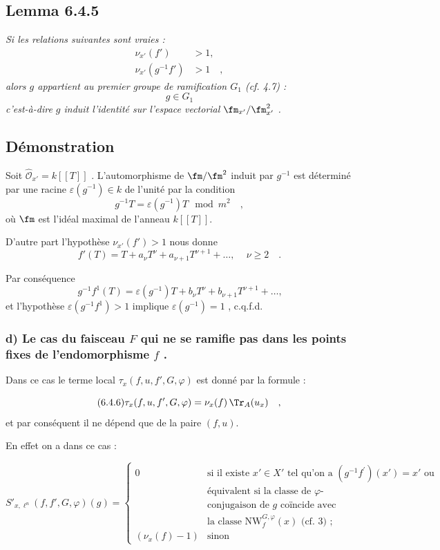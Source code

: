 \subsection*{Lemma 6.4.5}
\emph{Si les relations suivantes sont vraies :}
\begin{align*}
\nu_{x'}(f') &> 1 \text{,} \\
\nu_{x'}(g^{-1}f') &> 1 \quad ,
\end{align*}
\emph{alors $g$ appartient au premier groupe de ramification $G_1$ (cf. 4.7) :}
\[
g \in G_1
\]
\emph{c'est-à-dire $g$ induit l'identité sur l'espace vectorial $\fm_{x'}/\fm_{x'}^2$ .}

\subsection*{Démonstration}
Soit $\widehat{\mathcal{O}}_{x'} = k[[T]]$ . L'automorphisme de $\fm/\fm^2$ induit par $g^{-1}$ est déterminé par une racine $\varepsilon(g^{-1}) \in k$ de l'unité par la condition
\[
g^{-1}T = \varepsilon(g^{-1})T \mod m^2 \quad ,
\]
où $\fm$ est l'idéal maximal de l'anneau $k[[T]]$.

D'autre part l'hypothèse $\nu_{x'}(f') > 1$ nous donne
\[
f'(T) = T + a_\nu T^\nu + a_{\nu+1} T^{\nu+1} + \ldots \text{, } \quad \nu \geq 2 \quad .
\]

Par conséquence
\[
g^{-1}f^{1}(T) = \varepsilon(g^{-1})T + b_\nu T^\nu + b_{\nu+1} T^{\nu+1} + \ldots \text{,}
\]
et l'hypothèse $\varepsilon(g^{-1}f^{1}) > 1$ implique $\varepsilon(g^{-1}) = 1$ , c.q.f.d.

\subsubsection*{d) Le cas du faisceau $F$ qui ne se ramifie pas dans les points fixes de l'endomorphisme $f$ .}

Dans ce cas le terme local $\tau_x(f,u, f', G, \varphi)$ est donné par la formule :

\begin{equation}\tag{6.4.6}
\tau_x(f,u, f', G, \varphi) = \nu_x(f) \, \Tr_A(u_x) \quad ,
\end{equation}
et par conséquent il ne dépend que de la paire $(f,u)$.

En effet on a dans ce cas :

\begin{equation}\tag{6.4.7}
S'_{x,\ell^n}(f, f', G, \varphi)(g) = \begin{cases}
0 & \text{si il existe } x' \in X' \text{ tel qu'on a } (g^{-1}f^{\prime})(x') = x' \text{ ou}\\
& \text{équivalent si la classe de $\varphi$-}\\
& \text{conjugaison de $g$ coïncide avec}\\
& \text{la classe } \mathrm{NW}_{f}^{G,\varphi}(x) \text{ (cf. 3) ;}\\
(\nu_x(f)-1) & \text{sinon}
\end{cases}
\end{equation}

